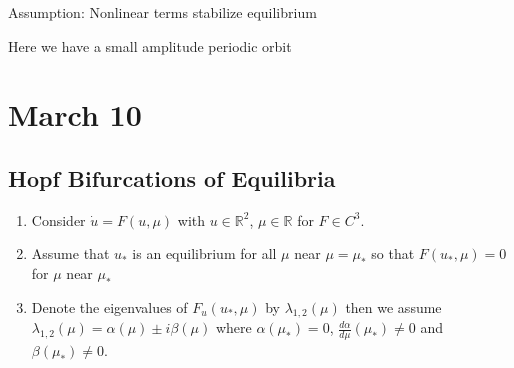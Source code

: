 \documentclass[12pt]{report}
\newcommand{\R}{\mathbb{R}}
\begin{document}
\begin{center}
\end{center}

\vspace{0.5cm}
\hspace{0.4\textwidth}
\parbox{1.8in}{Assumption: Nonlinear terms stabilize equilibrium}
\hspace{1cm}
\parbox{2in}{Here we have a small amplitude periodic orbit}

\section{March 10}
\subsection{Hopf Bifurcations of Equilibria}
\begin{enumerate}
    \item Consider $\dot u = F(u, \mu)$ with $u \in \R^2$, $\mu \in \R$ for $F \in C^3$.
    \item Assume that $u_*$ is an equilibrium for all $\mu$ near $\mu = \mu_*$ so that $F(u_*, \mu) = 0$ for $\mu$ near $\mu_*$
    \item Denote the eigenvalues of $F_u(u_*, \mu)$ by $\lambda_{1, 2}(\mu)$ then we assume $\lambda_{1, 2}(\mu) = \alpha(\mu) \pm i \beta(\mu)$ where $\alpha(\mu_*) = 0$, $\frac{d\alpha}{d\mu}(\mu_*) \neq 0$ and $\beta(\mu_*) \neq 0$.
\end{enumerate}
\end{document}
